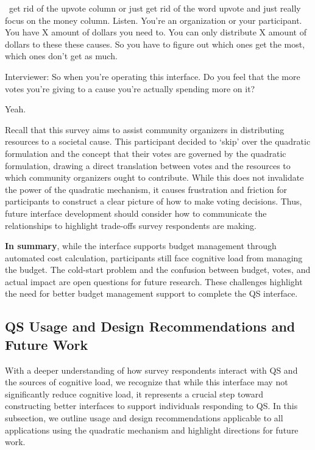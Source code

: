 \begin{displayquote}

~\bracketellipsis get rid of the upvote column or just get rid of the word upvote and just really focus on the money column. Listen. You're an organization or your participant. You have X amount of dollars you need to. You can only distribute X amount of dollars to these these causes. So you have to figure out which ones get the most, which ones don't get as much.~\bracketellipsis 

Interviewer: So when you're operating this interface. Do you feel that the more votes you're giving to a cause you're actually spending more on it?

Yeah. \hfill{}
\end{displayquote}
Recall that this survey aims to assist community organizers in distributing resources to a societal cause. This participant decided to `skip' over the quadratic formulation and the concept that their votes are governed by the quadratic formulation, drawing a direct translation between votes and the resources to which community organizers ought to contribute. While this does not invalidate the power of the quadratic mechanism, it causes frustration and friction for participants to construct a clear picture of how to make voting decisions. Thus, future interface development should consider how to communicate the relationships to highlight trade-offs survey respondents are making.

\textbf{In summary}, while the interface supports budget management through automated cost calculation, participants still face cognitive load from managing the budget. The cold-start problem and the confusion between budget, votes, and actual impact are open questions for future research. These challenges highlight the need for better budget management support to complete the QS interface.

\subsection{QS Usage and Design Recommendations and Future Work}
With a deeper understanding of how survey respondents interact with QS and the sources of cognitive load, we recognize that while this interface may not significantly reduce cognitive load, it represents a crucial step toward constructing better interfaces to support individuals responding to QS. In this subsection, we outline usage and design recommendations applicable to all applications using the quadratic mechanism and highlight directions for future work.

